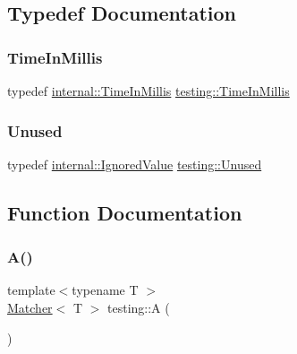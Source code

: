 \subsection{Typedef Documentation}
\mbox{\label{namespacetesting_a992de1d091ce660f451d1e8b3ce30fd6}} 
\subsubsection{\texorpdfstring{Time\+In\+Millis}{TimeInMillis}}
{\footnotesize\ttfamily typedef \hyperlink{namespacetesting_1_1internal_a66a845df404b38fe85c5e14a069f255a}{internal\+::\+Time\+In\+Millis} \hyperlink{namespacetesting_a992de1d091ce660f451d1e8b3ce30fd6}{testing\+::\+Time\+In\+Millis}}

\mbox{\label{namespacetesting_a603e329ec0263ebfcf16f712810bd511}} 
\subsubsection{\texorpdfstring{Unused}{Unused}}
{\footnotesize\ttfamily typedef \hyperlink{classtesting_1_1internal_1_1_ignored_value}{internal\+::\+Ignored\+Value} \hyperlink{namespacetesting_a603e329ec0263ebfcf16f712810bd511}{testing\+::\+Unused}}



\subsection{Function Documentation}
\mbox{\label{namespacetesting_a5e9134d655d2fc9323902348083282e7}} 
\subsubsection{\texorpdfstring{A()}{A()}}
{\footnotesize\ttfamily template$<$typename T $>$ \\
\hyperlink{classtesting_1_1_matcher}{Matcher}$<$ T $>$ testing\+::A (\begin{DoxyParamCaption}{ }\end{DoxyParamCaption})\hspace{0.3cm}{\ttfamily [inline]}}

